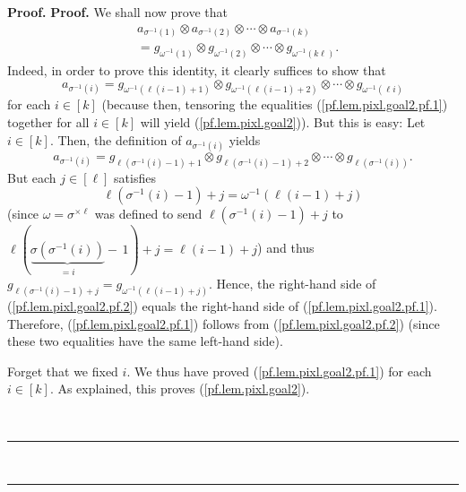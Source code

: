 \documentclass[numbers=enddot,12pt,final,onecolumn,notitlepage]{scrartcl}%
\theoremstyle{definition}
\newenvironment{proof}[1][Proof]{\noindent\textbf{#1.} }{\ \rule{0.5em}{0.5em}}
\begin{document}
\begin{proof}
\begin{proof}
We shall now prove that
\begin{align}
&  a_{\sigma^{-1}\left(  1\right)  }\otimes a_{\sigma^{-1}\left(  2\right)
}\otimes\cdots\otimes a_{\sigma^{-1}\left(  k\right)  }\nonumber\\
&  =g_{\omega^{-1}\left(  1\right)  }\otimes g_{\omega^{-1}\left(  2\right)
}\otimes\cdots\otimes g_{\omega^{-1}\left(  k\ell\right)  }.
\label{pf.lem.pixl.goal2}%
\end{align}
Indeed, in order to prove this identity, it clearly suffices to show that%
\begin{equation}
a_{\sigma^{-1}\left(  i\right)  }=g_{\omega^{-1}\left(  \ell\left(
i-1\right)  +1\right)  }\otimes g_{\omega^{-1}\left(  \ell\left(  i-1\right)
+2\right)  }\otimes\cdots\otimes g_{\omega^{-1}\left(  \ell i\right)  }
\label{pf.lem.pixl.goal2.pf.1}%
\end{equation}
for each $i\in\left[  k\right]  $ (because then, tensoring the equalities
(\ref{pf.lem.pixl.goal2.pf.1}) together for all $i\in\left[  k\right]  $ will
yield (\ref{pf.lem.pixl.goal2})). But this is easy: Let $i\in\left[  k\right]
$. Then, the definition of $a_{\sigma^{-1}\left(  i\right)  }$ yields%
\begin{equation}
a_{\sigma^{-1}\left(  i\right)  }=g_{\ell\left(  \sigma^{-1}\left(  i\right)
-1\right)  +1}\otimes g_{\ell\left(  \sigma^{-1}\left(  i\right)  -1\right)
+2}\otimes\cdots\otimes g_{\ell\left(  \sigma^{-1}\left(  i\right)  \right)
}. \label{pf.lem.pixl.goal2.pf.2}%
\end{equation}
But each $j\in\left[  \ell\right]  $ satisfies%
\[
\ell\left(  \sigma^{-1}\left(  i\right)  -1\right)  +j=\omega^{-1}\left(
\ell\left(  i-1\right)  +j\right)
\]
(since $\omega=\sigma^{\times\ell}$ was defined to send $\ell\left(
\sigma^{-1}\left(  i\right)  -1\right)  +j$ to $\ell\left(  \underbrace{\sigma
\left(  \sigma^{-1}\left(  i\right)  \right)  }_{=i}-\,1\right)
+j=\ell\left(  i-1\right)  +j$) and thus $g_{\ell\left(  \sigma^{-1}\left(
i\right)  -1\right)  +j}=g_{\omega^{-1}\left(  \ell\left(  i-1\right)
+j\right)  }$. Hence, the right-hand side of (\ref{pf.lem.pixl.goal2.pf.2})
equals the right-hand side of (\ref{pf.lem.pixl.goal2.pf.1}). Therefore,
(\ref{pf.lem.pixl.goal2.pf.1}) follows from (\ref{pf.lem.pixl.goal2.pf.2})
(since these two equalities have the same left-hand side).

Forget that we fixed $i$. We thus have proved (\ref{pf.lem.pixl.goal2.pf.1})
for each $i\in\left[  k\right]  $. As explained, this proves
(\ref{pf.lem.pixl.goal2}).


\end{proof}
\end{proof}
\end{document}
